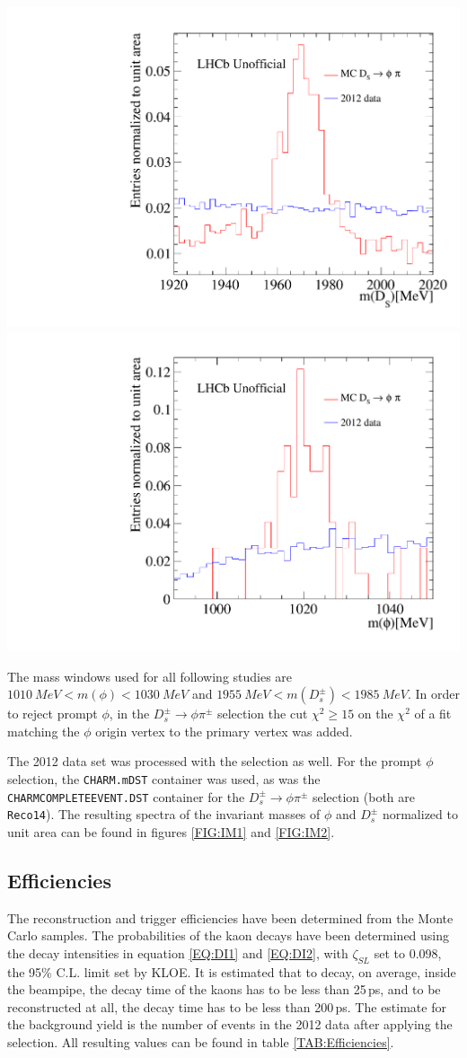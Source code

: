 \begin{center}
\includegraphics[width = .49\textwidth]{figs/m_Ds_Ds.pdf}
\includegraphics[width = .49\textwidth]{figs/m_phi_Ds.pdf}
\label{FIG:IM2}
\end{center}

The mass windows used for all following studies are $\SI{1010}{MeV} < m(\phi) < \SI{1030}{MeV}$ and $\SI{1955}{MeV} < m(D_s^\pm) < \SI{1985}{MeV}$. In order to reject prompt $\phi$, in the $D_s^\pm \rightarrow \phi \pi^\pm$ selection the cut $\chi^2 \geq 15$ on the $\chi^2$ of a fit matching the $\phi$ origin vertex to the primary vertex was added. 


The 2012 data set was processed with the selection as well. For the prompt $\phi$ selection, the \verb!CHARM.mDST! container was used, as was the \verb!CHARMCOMPLETEEVENT.DST! container for the $D_s^\pm \rightarrow \phi \pi^\pm$ selection (both are \verb!Reco14!). The resulting spectra of the invariant masses of $\phi$ and $D_s^\pm$ normalized to unit area can be found in figures \ref{FIG:IM1} and \ref{FIG:IM2}.


\subsection{Efficiencies}
The reconstruction and trigger efficiencies have been determined from the Monte Carlo samples. The probabilities of the kaon decays have been determined using the decay intensities in equation \eqref{EQ:DI1} and \eqref{EQ:DI2}, with 
$\zeta_{SL}$ set to 0.098, the 95\% C.L. limit set by KLOE. It is estimated that to decay, on 
average, inside the beampipe, the decay time of the kaons has to be less than 25\,ps, and to be reconstructed at all, the decay time has to be less than 200\,ps. The estimate for the background yield is the number of events in the 2012 data after applying the selection. All resulting values can be found in table \ref{TAB:Efficiencies}.


